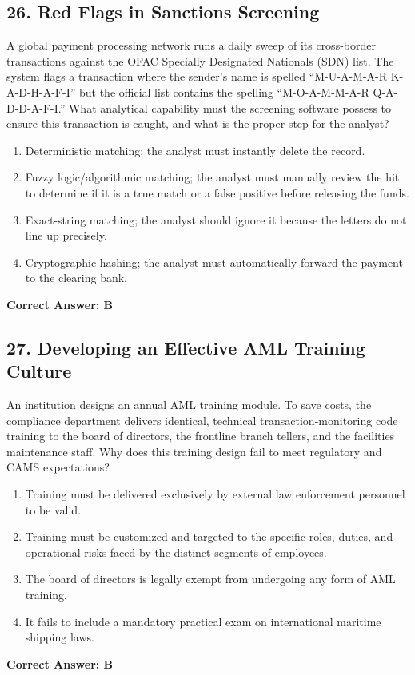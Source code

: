 \documentclass[11pt,a4paper]{article}
\begin{document}
	\subsection{26. Red Flags in Sanctions Screening}
	A global payment processing network runs a daily sweep of its cross-border transactions against the OFAC Specially Designated Nationals (SDN) list. The system flags a transaction where the sender's name is spelled ``M-U-A-M-A-R K-A-D-H-A-F-I'' but the official list contains the spelling ``M-O-A-M-M-A-R Q-A-D-D-A-F-I.'' What analytical capability must the screening software possess to ensure this transaction is caught, and what is the proper step for the analyst?
	\begin{enumerate}[label=\Alph*.]
		\item Deterministic matching; the analyst must instantly delete the record.
		\item Fuzzy logic/algorithmic matching; the analyst must manually review the hit to determine if it is a true match or a false positive before releasing the funds.
		\item Exact-string matching; the analyst should ignore it because the letters do not line up precisely.
		\item Cryptographic hashing; the analyst must automatically forward the payment to the clearing bank.
	\end{enumerate}
	\textbf{Correct Answer: B}
	
	\subsection{27. Developing an Effective AML Training Culture}
	An institution designs an annual AML training module. To save costs, the compliance department delivers identical, technical transaction-monitoring code training to the board of directors, the frontline branch tellers, and the facilities maintenance staff. Why does this training design fail to meet regulatory and CAMS expectations?
	\begin{enumerate}[label=\Alph*.]
		\item Training must be delivered exclusively by external law enforcement personnel to be valid.
		\item Training must be customized and targeted to the specific roles, duties, and operational risks faced by the distinct segments of employees.
		\item The board of directors is legally exempt from undergoing any form of AML training.
		\item It fails to include a mandatory practical exam on international maritime shipping laws.
	\end{enumerate}
	\textbf{Correct Answer: B}
	
\end{document}
